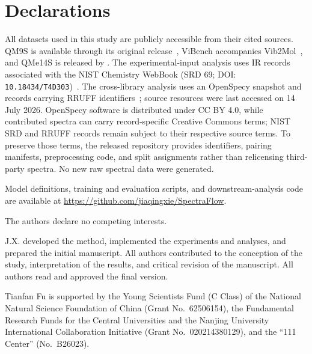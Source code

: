 \documentclass[pdflatex,sn-mathphys-num]{sn-jnl}%
\theoremstyle{thmstyleone}%
\theoremstyle{thmstyletwo}%
\theoremstyle{thmstylethree}%
\begin{document}
\section*{Declarations}

All datasets used in this study are publicly accessible from their cited sources. QM9S is available through its original release~\citep{zou2023deep}, ViBench accompanies Vib2Mol~\citep{lu2025vib2mol}, and QMe14S is released by \citet{yuan2025qme14s}. The experimental-input analysis uses IR records associated with the NIST Chemistry WebBook (SRD 69; DOI: \texttt{10.18434/T4D303})~\citep{nistwebbook}. The cross-library analysis uses an OpenSpecy snapshot and records carrying RRUFF identifiers~\citep{cowger2021openspecy,lafuente2015rruff}; source resources were last accessed on 14 July 2026. OpenSpecy software is distributed under CC BY 4.0, while contributed spectra can carry record-specific Creative Commons terms; NIST SRD and RRUFF records remain subject to their respective source terms. To preserve those terms, the released repository provides identifiers, pairing manifests, preprocessing code, and split assignments rather than relicensing third-party spectra. No new raw spectral data were generated.

Model definitions, training and evaluation scripts, and downstream-analysis code are available at \url{https://github.com/jiaqingxie/SpectraFlow}.

The authors declare no competing interests.

J.X. developed the method, implemented the experiments and analyses, and prepared the initial manuscript. All authors contributed to the conception of the study, interpretation of the results, and critical revision of the manuscript. All authors read and approved the final version.

Tianfan Fu is supported by the Young Scientists Fund (C Class) of the National Natural Science Foundation of China (Grant No.~62506154), the Fundamental Research Funds for the Central Universities and the Nanjing University International Collaboration Initiative (Grant No.~020214380129), and the ``111 Center'' (No.~B26023).
\end{document}
